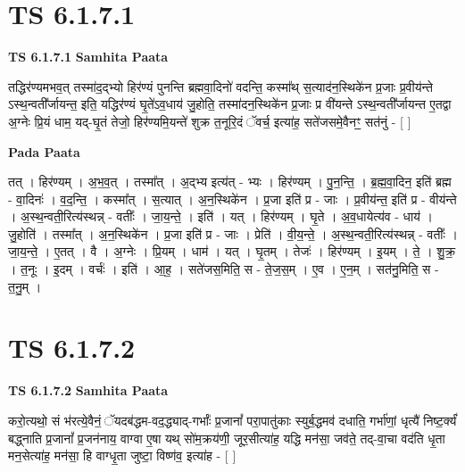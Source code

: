 \documentclass[17pt]{extarticle}
\begin{document}
\section*{ TS 6.1.7.1 }

\textbf{TS 6.1.7.1 } \newline
\textbf{Samhita Paata} \newline

तद्धिर॑ण्यमभव॒त् तस्मा॑द॒द्भ्यो हिर॑ण्यं पुनन्ति ब्रह्मवा॒दिनो॑ वदन्ति॒ कस्मा᳚थ् स॒त्याद॑न॒स्थिके॑न प्र॒जाः प्र॒वीय॑न्ते ऽस्थ॒न्वती᳚र्जायन्त॒ इति॒ यद्धिर॑ण्यं घृ॒ते॑ऽव॒धाय॑ जु॒होति॒ तस्मा॑दन॒स्थिके॑न प्र॒जाः प्र वी॑यन्ते ऽस्थ॒न्वती᳚र्जायन्त ए॒तद्वा अ॒ग्नेः प्रि॒यं धाम॒ यद्-घृ॒तं तेजो॒ हिर॑ण्यमि॒यन्ते॑ शुक्र त॒नूरि॒दं ॅवर्च॒ इत्या॑ह॒ सते॑जसमे॒वैनꣳ॒॒ सत॑नुं - [  ] \newline

\textbf{Pada Paata} \newline

तत् । हिर॑ण्यम् । अ॒भ॒व॒त् । तस्मा᳚त् । अ॒द्भ्य इत्य॑त् - भ्यः । हिर॑ण्यम् । पु॒न॒न्ति॒ । ब्र॒ह्म॒वा॒दिन॒ इति॑ ब्रह्म - वा॒दिनः॑ । व॒द॒न्ति॒ । कस्मा᳚त् । स॒त्यात् । अ॒न॒स्थिके॑न । प्र॒जा इति॑ प्र - जाः । प्र॒वीय॑न्त॒ इति॑ प्र - वीय॑न्ते । अ॒स्थ॒न्वती॒रित्य॑स्थन्न् - वतीः᳚ । जा॒य॒न्ते॒ । इति॑ । यत् । हिर॑ण्यम् । घृ॒ते । अ॒व॒धायेत्य॑व - धाय॑ । जु॒होति॑ । तस्मा᳚त् । अ॒न॒स्थिके॑न । प्र॒जा इति॑ प्र - जाः । प्रेति॑ । वी॒य॒न्ते॒ । अ॒स्थ॒न्वती॒रित्य॑स्थन्न् - वतीः᳚ । जा॒य॒न्ते॒ । ए॒तत् । वै । अ॒ग्नेः । प्रि॒यम् । धाम॑ । यत् । घृ॒तम् । तेजः॑ । हिर॑ण्यम् । इ॒यम् । ते॒ । शु॒क्र॒ । त॒नूः । इ॒दम् । वर्चः॑ । इति॑ । आ॒ह॒ । सते॑जस॒मिति॒ स - ते॒ज॒स॒म् । ए॒व । ए॒न॒म् । सत॑नु॒मिति॒ स - त॒नु॒म् ।  \newline




\section*{ TS 6.1.7.2 }

\textbf{TS 6.1.7.2 } \newline
\textbf{Samhita Paata} \newline

करो॒त्यथो॒ सं भ॑रत्ये॒वैनं॒ ॅयदब॑द्धम-वद॒द्ध्याद्-गर्भाः᳚ प्र॒जानां᳚ परा॒पातु॑काः स्युर्ब॒द्धमव॑ दधाति॒ गर्भा॑णां॒ धृत्यै॑ निष्ट॒र्क्यं॑ बद्ध्नाति प्र॒जानां᳚ प्र॒जन॑नाय॒ वाग्वा ए॒षा यथ् सो॑म॒क्रय॑णी॒ जूर॒सीत्या॑ह॒ यद्धि मन॑सा॒ जव॑ते॒ तद्-वा॒चा वद॑ति धृ॒ता मन॒सेत्या॑ह॒ मन॑सा॒ हि वाग्धृ॒ता जुष्टा॒ विष्ण॑व॒ इत्या॑ह - [  ] \newline
\end{document}
